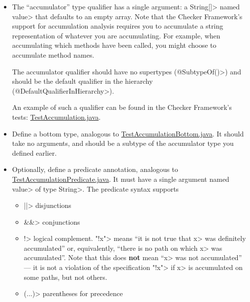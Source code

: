 \begin{itemize}
\item
The ``accumulator'' type qualifier has a single argument: a \<String[]> named
\<value> that defaults to an empty array.  Note that the Checker Framework's
support for accumulation analysis requires you to accumulate a string representation
of whatever you are accumulating. For example, when accumulating which methods have
been called, you might choose to accumulate method names.

The accumulator
qualifier should have no supertypes (\<@SubtypeOf({})>) and should
be the default qualifier in the hierarchy (\<@DefaultQualifierInHierarchy>).

An example of such a qualifier can be found in the Checker Framework's tests:
\href{https://github.com/typetools/checker-framework/blob/master/framework/src/test/java/org/checkerframework/framework/testchecker/testaccumulation/qual/TestAccumulation.java}{TestAccumulation.java}.

\item
Define a bottom type, analogous to
\href{https://github.com/typetools/checker-framework/blob/master/framework/src/test/java/org/checkerframework/framework/testchecker/testaccumulation/qual/TestAccumulationBottom.java}{TestAccumulationBottom.java}.
It should take no arguments, and should be a subtype of the accumulator type you defined earlier.

\item
Optionally, define a predicate annotation, analogous to
\href{https://github.com/typetools/checker-framework/blob/master/framework/src/test/java/org/checkerframework/framework/testchecker/testaccumulation/qual/TestAccumulationPredicate.java}{TestAccumulationPredicate.java}.
It must have a single argument named \<value> of type \<String>.
The predicate syntax supports
\begin{itemize}
\item \<||> disjunctions
\item \<\&\&> conjunctions
\item \<!> logical complement.  \<"!x"> means
``it is not true that \<x> was definitely accumulated'' or, equivalently, ``there is no path on which \<x> was accumulated''.
Note that this does \textbf{not} mean ``\<x> was not accumulated'' --- it is not a violation of the specification \<"!x"> if \<x> is accumulated
on some paths, but not others.
\item \<(...)> parentheses for precedence
\end{itemize}

\end{itemize}

